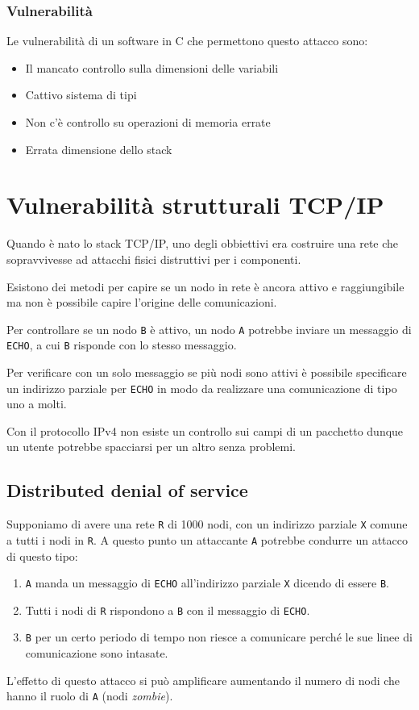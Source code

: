 \subsubsection{Vulnerabilità}
Le vulnerabilità di un software in C che permettono questo attacco sono:
\begin{itemize}
	\item Il mancato controllo sulla dimensioni delle variabili
	\item Cattivo sistema di tipi
	\item Non c'è controllo su operazioni di memoria errate
	\item Errata dimensione dello stack
\end{itemize}

\section{Vulnerabilità strutturali TCP/IP}
Quando è nato lo stack TCP/IP, uno degli obbiettivi era costruire una rete che sopravvivesse ad attacchi fisici
distruttivi per i componenti.

Esistono dei metodi per capire se un nodo in rete è ancora attivo e raggiungibile ma non è possibile capire l'origine
delle comunicazioni.

Per controllare se un nodo \verb|B| è attivo, un nodo \verb|A| potrebbe inviare un messaggio di \verb|ECHO|, a cui
\verb|B| risponde con lo stesso messaggio.

Per verificare con un solo messaggio se più nodi sono attivi è possibile specificare un indirizzo parziale per
\verb|ECHO| in modo da realizzare una comunicazione di tipo uno a molti.

Con il protocollo IPv4 non esiste un controllo sui campi di un pacchetto dunque un utente potrebbe spacciarsi per un
altro senza problemi.

\subsection{Distributed denial of service}
Supponiamo di avere una rete \verb|R| di 1000 nodi, con un indirizzo parziale \verb|X| comune a tutti i nodi in
\verb|R|. A questo punto un attaccante \verb|A| potrebbe condurre un attacco di questo tipo:
\begin{enumerate}
	\item \verb|A| manda un messaggio di \verb|ECHO| all'indirizzo parziale \verb|X| dicendo di essere \verb|B|.
	\item Tutti i nodi di \verb|R| rispondono a \verb|B| con il messaggio di \verb|ECHO|.
	\item \verb|B| per un certo periodo di tempo non riesce a comunicare perché le sue linee di comunicazione sono
	      intasate.
\end{enumerate}
L'effetto di questo attacco si può amplificare aumentando il numero di nodi che hanno il ruolo di \verb|A| (nodi
\emph{zombie}).


